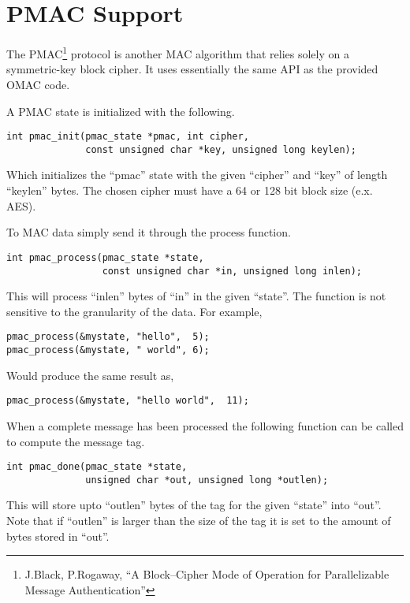 \documentclass[a4paper]{book}
\begin{document}
\section{PMAC Support}
The PMAC\footnote{J.Black, P.Rogaway, ``A Block--Cipher Mode of Operation for Parallelizable Message Authentication''} 
protocol is another MAC algorithm that relies solely on a symmetric-key block cipher.  It uses essentially the same
API as the provided OMAC code.  

A PMAC state is initialized with the following.

\begin{verbatim}
int pmac_init(pmac_state *pmac, int cipher, 
              const unsigned char *key, unsigned long keylen);
\end{verbatim}
Which initializes the ``pmac'' state with the given ``cipher'' and ``key'' of length ``keylen'' bytes.  The chosen cipher
must have a 64 or 128 bit block size (e.x. AES).

To MAC data simply send it through the process function.

\begin{verbatim}
int pmac_process(pmac_state *state, 
                 const unsigned char *in, unsigned long inlen);
\end{verbatim}
This will process ``inlen'' bytes of ``in'' in the given ``state''.  The function is not sensitive to the granularity of the
data.  For example,

\begin{verbatim}
pmac_process(&mystate, "hello",  5);
pmac_process(&mystate, " world", 6);
\end{verbatim}

Would produce the same result as,

\begin{verbatim}
pmac_process(&mystate, "hello world",  11);
\end{verbatim}

When a complete message has been processed the following function can be called to compute the message tag.

\begin{verbatim}
int pmac_done(pmac_state *state, 
              unsigned char *out, unsigned long *outlen);
\end{verbatim}
This will store upto ``outlen'' bytes of the tag for the given ``state'' into ``out''.  Note that if ``outlen'' is larger
than the size of the tag it is set to the amount of bytes stored in ``out''.
\end{document}
